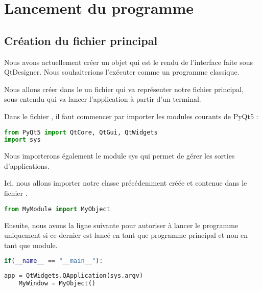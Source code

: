 \section{Lancement du programme}

\subsection{Création du fichier principal}

Nous avons actuellement créer un objet  qui est le rendu de l'interface faite sous QtDesigner. Nous souhaiterions l'exécuter comme un programme classique. \newline


Nous allons créer dans le  un fichier  qui va représenter notre fichier principal, sous-entendu qui va lancer l'application à partir d'un terminal. \newline


Dans le fichier , il faut commencer par importer les modules courants de PyQt5 : 
\begin{lstlisting}[language=Python]
from PyQt5 import QtCore, QtGui, QtWidgets
import sys
\end{lstlisting}
Nous importerons également le module sys qui permet de gérer les sorties d'applications. \newline

Ici, nous allons importer notre classe  précédemment créée et contenue dans le fichier .
\begin{lstlisting}[language=Python]
from MyModule import MyObject
\end{lstlisting}


Ensuite, nous avons la ligne suivante pour autoriser à lancer le programme uniquement si ce dernier est lancé en tant que programme principal et non en tant que module.

\begin{lstlisting}[language=Python]
if(__name__ == "__main__"):
\end{lstlisting}


\begin{lstlisting}[language=Python]
    app = QtWidgets.QApplication(sys.argv)
    MyWindow = MyObject()
\end{lstlisting}

